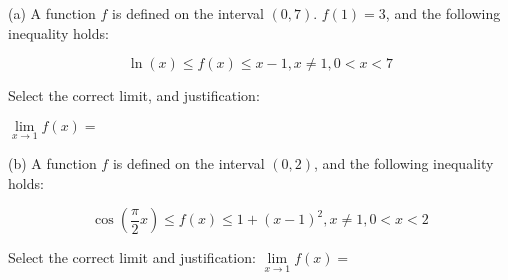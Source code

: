 \documentclass{ximera}
\author{Tom Dinitz and Nela Lakos}
\begin{document}
\begin{exercise}

(a) A function $f$ is defined on the interval $(0,7)$. $f(1)=3$, and the following inequality holds:

$$\ln(x)\leq f(x) \leq x-1, x\neq 1, 0<x<7$$

Select the correct limit, and justification:

$\lim\limits_{x\to 1} f(x)=$ 
\begin{prompt}
\begin{multipleChoice}
\end{multipleChoice}
\end{prompt}

(b) A function $f$ is defined on the interval $(0,2)$, and the following inequality holds:

$$\cos(\frac{\pi}{2}x)\leq f(x) \leq 1+(x-1)^2, x\neq 1, 0<x<2$$

Select the correct limit and justification:
$\lim\limits_{x\to 1} f(x)=$

\begin{prompt}
\begin{multipleChoice}
\end{multipleChoice}                                                                            
\end{prompt}      

\end{exercise}
\end{document}

